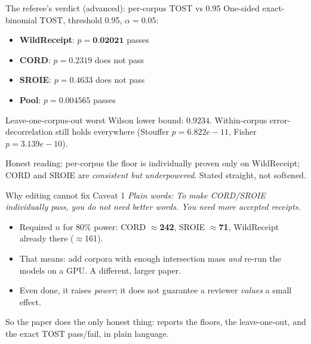 \documentclass[aspectratio=169]{beamer}
\newcommand{\rgLocoMinWil}{0.9234}
\newcommand{\rgTostCordP}{0.2319}
\newcommand{\rgTostSroieP}{0.4633}
\newcommand{\rgTostWrP}{0.02021}
\newcommand{\rgTostPoolP}{0.004565}
\newcommand{\rgReqnCord}{242}
\newcommand{\rgReqnSroie}{71}
\newcommand{\rgReqnWr}{161}
\newcommand{\rgAFiveStouffer}{6.822e-11}
\newcommand{\rgAFiveFisher}{3.139e-10}
\newcommand{\keybox}[1]{\begin{center}\colorbox{grey!15}{\parbox{0.92\linewidth}{\centering #1}}\end{center}}
\newcommand{\plain}[1]{\textit{\textcolor{sig}{Plain words:} #1}}
\begin{document}
\begin{frame}{The referee's verdict (advanced): per-corpus TOST vs 0.95}
One-sided exact-binomial TOST, threshold 0.95, $\alpha{=}0.05$:
\begin{itemize}
\item \textbf{WildReceipt}: $p=\textbf{\rgTostWrP}$ \quad
\textcolor{ok}{passes}
\item \textbf{CORD}: $p=\rgTostCordP$ \quad \textcolor{bad}{does not
pass}
\item \textbf{SROIE}: $p=\rgTostSroieP$ \quad \textcolor{bad}{does not
pass}
\item \textbf{Pool}: $p=\rgTostPoolP$ \quad \textcolor{ok}{passes}
\end{itemize}
\vspace{0.2em}
Leave-one-corpus-out worst Wilson lower bound: \textbf{$\rgLocoMinWil$}.
Within-corpus error-decorrelation still holds everywhere (Stouffer
$p=\rgAFiveStouffer$, Fisher $p=\rgAFiveFisher$).
\keybox{Honest reading: per-corpus the floor is individually proven only
on WildReceipt; CORD and SROIE are \emph{consistent but underpowered}.
Stated straight, not softened.}
\end{frame}

\begin{frame}{Why editing cannot fix Caveat 1}
\plain{To make CORD/SROIE individually pass, you do not need better
words. You need more accepted receipts.}
\begin{itemize}
\item Required $n$ for 80\% power: CORD $\approx$\textbf{\rgReqnCord},
SROIE $\approx$\textbf{\rgReqnSroie}, WildReceipt already there
($\approx$\rgReqnWr).
\item That means: add corpora with enough intersection mass \emph{and}
re-run the models on a GPU. A different, larger paper.
\item Even done, it raises \emph{power}; it does not guarantee a
reviewer \emph{values} a small effect.
\end{itemize}
\keybox{So the paper does the only honest thing: reports the floors, the
leave-one-out, and the exact TOST pass/fail, in plain language.}
\end{frame}

\end{document}
